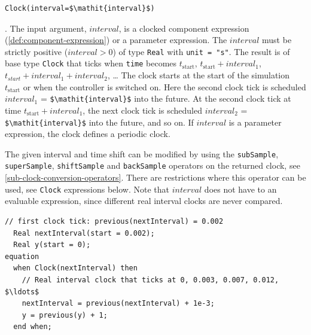 \begin{operatordefinition*}[Clock]\label{modelica:clock-interval}
\begin{synopsis}\begin{lstlisting}
Clock(interval=$\mathit{interval}$)
\end{lstlisting}\end{synopsis}
\begin{semantics}
.
The input argument, $\mathit{interval}$, is a clocked component expression (\cref{def:component-expression}) or a parameter expression.
The $\mathit{interval}$ must be strictly positive ($\mathit{interval} > 0$) of type \lstinline!Real! with \lstinline!unit = "s"!.
The result is of base type \lstinline!Clock! that ticks when \lstinline!time! becomes $t_{\mathrm{start}}$, $t_{\mathrm{start}} + \mathit{interval}_{1}$, $t_{\mathit{start}} + \mathit{interval}_{1} + \mathit{interval}_{2}$, \@\ldots{}
The clock starts at the start of the simulation $t_{\mathrm{start}}$ or when the controller is switched on.
Here the second clock tick is scheduled $\mathit{interval}_{1}$ = \lstinline!$\mathit{interval}$! into the future.
At the second clock tick at time $t_{\mathrm{start}} + \mathit{interval}_{1}$, the next clock tick is scheduled $\mathit{interval}_{2}$ = \lstinline!$\mathit{interval}$! into the future, and so on.
If $\mathit{interval}$ is a parameter expression, the clock defines a periodic clock.

\begin{nonnormative}
The given interval and time shift can be modified by using the \lstinline!subSample!, \lstinline!superSample!, \lstinline!shiftSample! and \lstinline!backSample! operators on the returned clock, see \cref{sub-clock-conversion-operators}.
There are restrictions where this operator can be used, see \lstinline!Clock! expressions below.
Note that $\mathit{interval}$ does not have to an evaluable expression, since different real interval clocks are never compared.
\end{nonnormative}

\begin{example}
\begin{lstlisting}[language=modelica]
  // first clock tick: previous(nextInterval) = 0.002
  Real nextInterval(start = 0.002);
  Real y(start = 0);
equation
  when Clock(nextInterval) then
    // Real interval clock that ticks at 0, 0.003, 0.007, 0.012, $\ldots$
    nextInterval = previous(nextInterval) + 1e-3;
    y = previous(y) + 1;
  end when;
\end{lstlisting}
\end{example}
\end{semantics}
\end{operatordefinition*}

